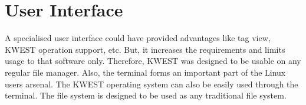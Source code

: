 \section{User Interface}
A specialised user interface could have provided advantages like tag view, KWEST operation support, etc. But, it increases the requirements and limits usage to that software only. Therefore, KWEST was designed to be usable on any regular file manager. Also, the terminal forms an important part of the Linux users arsenal. The KWEST operating system can also be easily used through the terminal. The file system is designed to be used as any traditional file system. 
